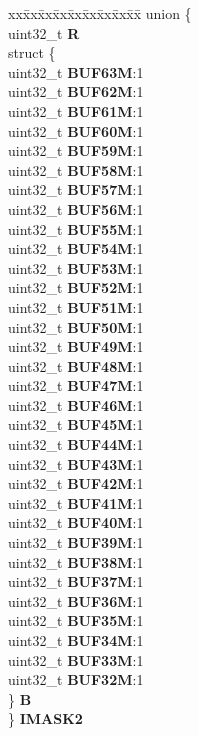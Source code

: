 \begin{DoxyCompactItemize}
\begin{tabbing}
\end{tabbing}\item 
\mbox{\label{structFLEXCAN__tag_a3724ed1089a8aea0c813534483b95976}} 
\begin{tabbing}
xx\=xx\=xx\=xx\=xx\=xx\=xx\=xx\=xx\=\kill
union \{\\
\>uint32\_t {\bfseries R}\\
\>struct \{\\
\>\>uint32\_t {\bfseries BUF63M}:1\\
\>\>uint32\_t {\bfseries BUF62M}:1\\
\>\>uint32\_t {\bfseries BUF61M}:1\\
\>\>uint32\_t {\bfseries BUF60M}:1\\
\>\>uint32\_t {\bfseries BUF59M}:1\\
\>\>uint32\_t {\bfseries BUF58M}:1\\
\>\>uint32\_t {\bfseries BUF57M}:1\\
\>\>uint32\_t {\bfseries BUF56M}:1\\
\>\>uint32\_t {\bfseries BUF55M}:1\\
\>\>uint32\_t {\bfseries BUF54M}:1\\
\>\>uint32\_t {\bfseries BUF53M}:1\\
\>\>uint32\_t {\bfseries BUF52M}:1\\
\>\>uint32\_t {\bfseries BUF51M}:1\\
\>\>uint32\_t {\bfseries BUF50M}:1\\
\>\>uint32\_t {\bfseries BUF49M}:1\\
\>\>uint32\_t {\bfseries BUF48M}:1\\
\>\>uint32\_t {\bfseries BUF47M}:1\\
\>\>uint32\_t {\bfseries BUF46M}:1\\
\>\>uint32\_t {\bfseries BUF45M}:1\\
\>\>uint32\_t {\bfseries BUF44M}:1\\
\>\>uint32\_t {\bfseries BUF43M}:1\\
\>\>uint32\_t {\bfseries BUF42M}:1\\
\>\>uint32\_t {\bfseries BUF41M}:1\\
\>\>uint32\_t {\bfseries BUF40M}:1\\
\>\>uint32\_t {\bfseries BUF39M}:1\\
\>\>uint32\_t {\bfseries BUF38M}:1\\
\>\>uint32\_t {\bfseries BUF37M}:1\\
\>\>uint32\_t {\bfseries BUF36M}:1\\
\>\>uint32\_t {\bfseries BUF35M}:1\\
\>\>uint32\_t {\bfseries BUF34M}:1\\
\>\>uint32\_t {\bfseries BUF33M}:1\\
\>\>uint32\_t {\bfseries BUF32M}:1\\
\>\} {\bfseries B}\\
\} {\bfseries IMASK2}\\


\end{tabbing}
\end{DoxyCompactItemize}
